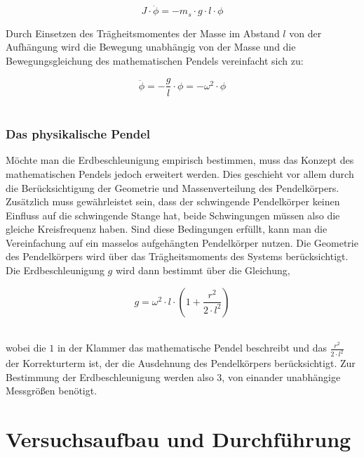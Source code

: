 \documentclass[a4paper, 11pt]{article}
\begin{document}
\begin{equation*}
J \cdot \ddot{\phi} = -m_s \cdot g \cdot l \cdot \phi
\end{equation*}


Durch Einsetzen des Trägheitsmomentes der Masse im Abstand $l$ von der Aufhängung wird die Bewegung unabhängig von der Masse und die Bewegungsgleichung des mathematischen Pendels vereinfacht sich zu: 

\begin{equation*}
\ddot{\phi} = -\frac{g}{l} \cdot \phi = -\omega^2 \cdot \phi
\end{equation*}\

\subsubsection{Das physikalische Pendel}
Möchte man die Erdbeschleunigung empirisch bestimmen, muss das Konzept des mathematischen Pendels jedoch erweitert werden. Dies geschieht vor allem durch die Berücksichtigung der Geometrie und Massenverteilung des Pendelkörpers. Zusätzlich muss gewährleistet sein, dass der schwingende Pendelkörper keinen Einfluss auf die schwingende Stange hat, beide Schwingungen müssen also die gleiche Kreisfrequenz haben.
Sind diese Bedingungen erfüllt, kann man die Vereinfachung auf ein masselos aufgehängten Pendelkörper nutzen. Die Geometrie des Pendelkörpers wird über das Trägheitsmoments des Systems berücksichtigt. Die Erdbeschleunigung $g$ wird dann bestimmt über die Gleichung,

\begin{equation*}
g = \omega^2 \cdot l \cdot (1+\frac{r^2}{2 \cdot l^2})
\end{equation*}\

wobei die $1$ in der Klammer das mathematische Pendel beschreibt und das $\frac{r^2}{2 \cdot l^2}$ der Korrekturterm ist, der die Ausdehnung des Pendelkörpers berücksichtigt. Zur Bestimmung der Erdbeschleunigung werden also 3, von einander unabhängige Messgrößen benötigt.
\newpage

\section{Versuchsaufbau und Durchführung}
\end{document}
